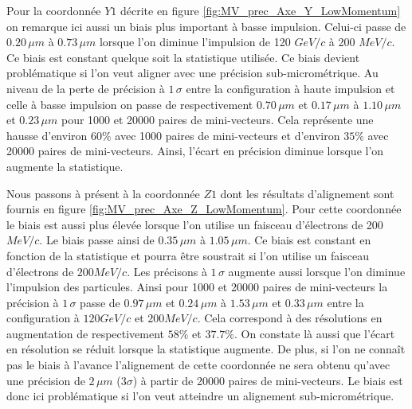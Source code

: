   \medskip 
  
  Pour la coordonn\'ee $Y1$ d\'ecrite en figure \ref{fig:MV_prec_Axe_Y_LowMomentum} on remarque ici aussi un biais plus important \`a basse impulsion. Celui-ci passe de $0.20 \, \mu m$ \`a $0.73 \, \mu m$ lorsque l'on diminue l'impulsion de 120 $GeV/c$ \`a 200 $MeV/c$. Ce biais est constant quelque soit la statistique utilis\'ee. Ce biais devient probl\'ematique si l'on veut aligner avec une pr\'ecision sub-microm\'etrique. Au niveau de la perte de pr\'ecision \`a $1 \, \sigma$ entre la configuration \`a haute impulsion et celle \`a basse impulsion on passe de respectivement $0.70 \, \mu m$ et $0.17 \, \mu m$ \`a $1.10 \, \mu m$ et $0.23 \, \mu m$ pour 1000 et 20000 paires de mini-vecteurs. Cela repr\'esente une hausse d'environ $60\%$ avec 1000 paires de mini-vecteurs et d'environ $35\%$ avec 20000 paires de mini-vecteurs. Ainsi, l'\'ecart en pr\'ecision diminue lorsque l'on augmente la statistique.
  
  \medskip

  Nous passons \`a pr\'esent \`a la coordonn\'ee $Z1$ dont les r\'esultats d'alignement sont fournis en figure \ref{fig:MV_prec_Axe_Z_LowMomentum}. Pour cette coordonn\'ee le biais est aussi plus \'elev\'ee lorsque l'on utilise un faisceau d'\'electrons de 200 $MeV/c$. Le biais passe ainsi de $0.35 \, \mu m$ \`a $1.05 \, \mu m$. Ce biais est constant en fonction de la statistique et pourra \^etre soustrait si l'on utilise un faisceau d'\'electrons de $200 MeV/c$. Les pr\'ecisons \`a $1 \, \sigma$ augmente aussi lorsque l'on diminue l'impulsion des particules. Ainsi pour 1000 et 20000 paires de mini-vecteurs la pr\'ecision \`a $1 \, \sigma$ passe de $0.97 \, \mu m$ et $0.24 \, \mu m$ \`a $1.53 \, \mu m$ et $0.33 \, \mu m$ entre la configuration \`a $120 GeV/c$ et $200 MeV/c$. Cela correspond \`a des r\'esolutions en augmentation de respectivement $58\%$ et $37.7\%$. On constate là aussi que l'\'ecart en r\'esolution se r\'eduit lorsque la statistique augmente. De plus, si l'on ne connaît pas le biais \`a l'avance l'alignement de cette coordonn\'ee ne sera obtenu qu'avec une pr\'ecision de $2 \, \mu m$ ($3 \sigma$) \`a partir de 20000 paires de mini-vecteurs. Le biais est donc ici probl\'ematique si l'on veut atteindre un alignement sub-microm\'etrique.
  
  \medskip
  
